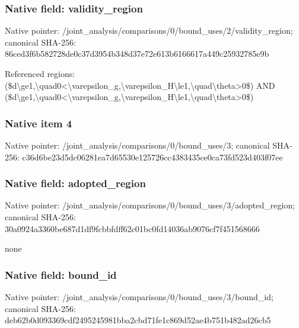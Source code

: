 \documentclass[10pt,a4paper]{article}
\begin{document}
\subsubsection{Native field: validity\_\allowbreak{}region}
Native pointer: /joint\_\allowbreak{}analysis/comparisons/0/bound\_\allowbreak{}uses/2/validity\_\allowbreak{}region; canonical SHA-256: 86ced3f6b582728de0c37d3954b348d37e72e613b6166617a449c25932785e9b

\begingroup\raggedright\sloppy Referenced regions:\allowbreak{} (\$d\textbackslash{}ge1,\allowbreak{}\textbackslash{}quad0<\textbackslash{}varepsilon\_\allowbreak{}g,\allowbreak{}\textbackslash{}varepsilon\_\allowbreak{}H\textbackslash{}le1,\allowbreak{}\textbackslash{}quad\textbackslash{}theta>0\$) AND (\$d\textbackslash{}ge1,\allowbreak{}\textbackslash{}quad0<\textbackslash{}varepsilon\_\allowbreak{}g,\allowbreak{}\textbackslash{}varepsilon\_\allowbreak{}H\textbackslash{}le1,\allowbreak{}\textbackslash{}quad\textbackslash{}theta>0\$)\par\endgroup

\subsubsection{Native item 4}
Native pointer: /joint\_\allowbreak{}analysis/comparisons/0/bound\_\allowbreak{}uses/3; canonical SHA-256: c36d6be23d5dc06281ea7d65530e125726cc4383435ce0ca73fd523d403f07ee

\subsubsection{Native field: adopted\_\allowbreak{}region}
Native pointer: /joint\_\allowbreak{}analysis/comparisons/0/bound\_\allowbreak{}uses/3/adopted\_\allowbreak{}region; canonical SHA-256: 30a0924a3360be687d1df9fcbbfdff62c01bc0fd14036ab9076cf7f451568666

\begingroup\raggedright\sloppy none\par\endgroup

\subsubsection{Native field: bound\_\allowbreak{}id}
Native pointer: /joint\_\allowbreak{}analysis/comparisons/0/bound\_\allowbreak{}uses/3/bound\_\allowbreak{}id; canonical SHA-256: deb62b0d093369cdf2495245981bba2cbd71fe1c869d52ae4b751b482ad26cb5
\end{document}
